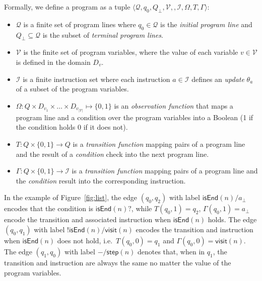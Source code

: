 \documentclass[10pt,a4paper]{paper}
\newcommand{\tup}[1]{{\langle #1 \rangle}}
\begin{document}
Formally, we define a program as a tuple $\tup{\mathcal{Q},q_0,Q_\bot,\mathcal{V},,\mathcal{I},\Omega,T,\Gamma}$:
\begin{itemize}
\item $\mathcal{Q}$ is a finite set of program lines where $q_0\in \mathcal{Q}$ is the {\em initial program line} and $Q_\bot\subseteq \mathcal{Q}$ is the subset of {\em terminal program lines}.
\item $\mathcal{V}$ is the finite set of program variables, where the value of each variable $v\in\mathcal{V}$ is defined in the domain $D_v$.
\item $\mathcal{I}$ is a finite instruction set where each instruction $a\in \mathcal{I}$ defines an {\em update} $\theta_a$ of a subset of the program variables.
\item $\Omega:Q\times D_{v_1}\times \ldots \times D_{v_{|\mathcal{V}|}}\mapsto\{0,1\}$ is an {\em observation function} that maps a program line and a condition over the program variables into a Boolean (1 if the condition holds 0 if  it does not). 
\item $T:Q\times\{0,1\}\rightarrow Q$ is a {\em transition function} mapping pairs of a program line and the result of a {\em condition} check into the next program line.
\item $\Gamma:Q\times\{0,1\}\rightarrow \mathcal{I}$ is a {\em transition function} mapping pairs of a program line and the {\em condition} result into the corresponding instruction.
\end{itemize}

In the example of Figure~\ref{fig:list}, the edge $(q_0,q_2)$ with label $\mathsf{isEnd}(n)/a_\bot$ encodes that the condition is $\mathsf{isEnd}(n)?$, while $T(q_0,1)=q_2$, $\Gamma(q_0,1)=a_\bot$ encode the transition and associated instruction when $\mathsf{isEnd}(n)$ holds. The edge $(q_0,q_1)$ with label $!\mathsf{isEnd}(n)/\mathsf{visit}(n)$ encodes the transition and instruction when $\mathsf{isEnd}(n)$ does not hold, i.e.~$T(q_0,0)=q_1$ and $\Gamma(q_0,0)=\mathsf{visit}(n)$. The edge $(q_1,q_0)$ with label $-/\mathsf{step}(n)$ denotes that, when in $q_1$, the transition and instruction are always the same no matter the value of the program variables.
\end{document}
